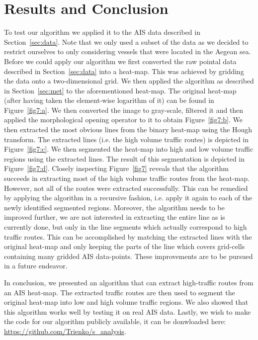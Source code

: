 \documentclass{article}
\begin{document}
\section{Results and Conclusion}
To test our algorithm we applied it to the AIS data described in Section~\ref{sec:data}. Note that we only used a subset of the data as we decided to restrict ourselves to only considering vessels that were located in the Aegean sea. Before we could apply our algorithm we first converted the raw pointal data described in Section~\ref{sec:data} into a heat-map.
This was achieved by gridding the data onto a two-dimensional grid. We then applied the algorithm as described in Section~\ref{sec:met} to the aforementioned heat-map. 
The original heat-map (after having taken the element-wise logarithm of it) can be found in Figure~\ref{fig7:a}. We then converted the image to gray-scale, filtered it and 
then applied the morphological opening operator to it to obtain Figure~\ref{fig7:b}. We then extracted the most obvious lines from the binary heat-map using the Hough transform. The 
extracted lines (i.e. the high volume traffic routes) is depicted in Figure~\ref{fig7:c}. We then segmented the heat-map into high and low volume traffic regions using the 
extracted lines. The result of this segmentation is depicted in Figure~\ref{fig7:d}. Closely inspecting Figure~\ref{fig7} reveals that the algorithm succeeds in extracting most of the high volume traffic routes from the heat-map.
However, not all of the routes were extracted successfully. This can be remedied by applying the algorithm in a recursive fashion, i.e. apply it again to each of the newly identified segmented regions. Moreover, 
the algorithm needs to be improved further, we are not interested in extracting the entire line as is currently done, but only in the line segments which actually correspond to high 
traffic routes. This can be accomplished by matching the extracted lines with the original heat-map and only keeping the parts of the line 
which covers grid-cells containing many gridded AIS data-points. These improvements are to be pursued in a future endeavor.

In conclusion, we presented an algorithm that can extract high-traffic routes from an AIS heat-map. The extracted traffic routes are then used to segment the original 
heat-map into low and high volume traffic regions. We also showed that this algorithm works well by testing it on real 
AIS data. Lastly, we wish to make the code for our algorithm publicly available, it can be donwloaded here: \url{https://github.com/Trienko/s_analysis}.
\end{document}
